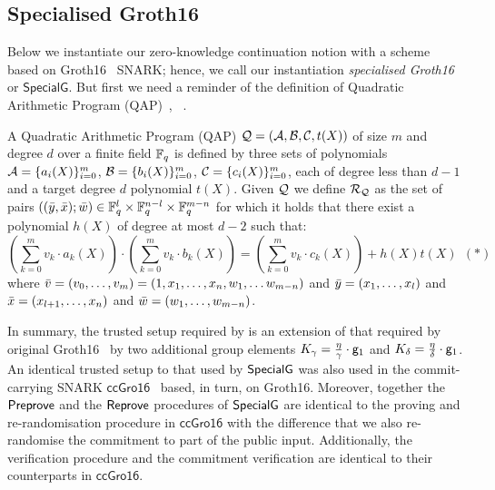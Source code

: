 
\subsection{Specialised Groth16}
\label{sec:rvrf_groth16}

Below we instantiate our zero-knowledge continuation notion with a scheme based on Groth16~\cite{Groth16} SNARK;
hence, we call our instantiation \emph{specialised Groth16} or \emph{$\mathsf{SpecialG}$}. But first we need a 
reminder of the definition of Quadratic Arithmetic Program (QAP)~\cite{LegoSNARK}, ~\cite{GGPR13}.

\begin{definition}[QAP] 
\label{def:QAP}
A Quadratic Arithmetic Program (QAP) $\mathcal{Q} = (\mathcal{A}, \mathcal{B}, \mathcal{C}, t(X))$ of size $m$ 
and degree $d$ over a finite field $\mathbb{F}_q$ is defined by three sets of polynomials $\mathcal{A} = \{a_i(X)\}_{i=0}^m$, 
$\mathcal{B} = \{b_i(X)\}_{i=0}^m$, $\mathcal{C} = \{c_i(X)\}_{i=0}^m$, each of degree less than $d-1$ and a target degree $d$ polynomial $t(X)$. Given 
$\mathcal{Q}$ we define $\mathcal{R}_{\mathcal{Q}}$ as the set of pairs $((\bar{y}, \bar{x}); \bar{w}) \in \mathbb{F}_q^{l} \times \mathbb{F}_q^{n-l} \times \mathbb{F}_q^{m-n}$ for which it 
holds that there exist a polynomial $h(X)$ of degree at most $d-2$ such that:
$$(\sum_{k=0}^m v_k \cdot a_k(X)) \cdot (\sum_{k=0}^m v_k \cdot b_k(X)) = (\sum_{k=0}^m v_k \cdot c_k(X)) + h(X)t(X) \ \ (\ast)$$ 
where $\bar{v} = (v_0, \ldots, v_m) = (1, x_1, \ldots, x_n, w_1, \ldots w_{m-n})$ and $\bar{y} = (x_1, \ldots, x_l)$ and 
$\bar{x} = (x_{l+1}, \ldots, x_n)$ and $\bar{w} = (w_1, \ldots, w_{m-n})$. 
\end{definition}

\noindent In summary, the trusted setup required by \SpecialG is 
an extension of that required by original Groth16~\cite{Groth16} by two additional 
group elements $K_{\gamma} = \frac{\eta}{\gamma} \cdot \mathsf{g}_1 $ and $K_{\delta} = \frac{\eta}{\delta} \cdot \mathsf{g}_1$. 
An identical trusted setup to that used by ${\mathsf{SpecialG}}$ was also used in the commit-carrying SNARK $\mathsf{ccGro16}$~\cite[Fig.~22]{LegoSNARK} 
based, in turn, on Groth16. Moreover, together the ${\mathsf{Preprove}}$ and the ${\mathsf{Reprove}}$ procedures of ${\mathsf{SpecialG}}$ are identical to the proving and re-randomisation 
procedure in $\mathsf{ccGro16}$ with the difference that we also re-randomise the commitment to part of the public input. Additionally, 
the verification procedure and the commitment verification are identical to their counterparts in $\mathsf{ccGro16}$. 


